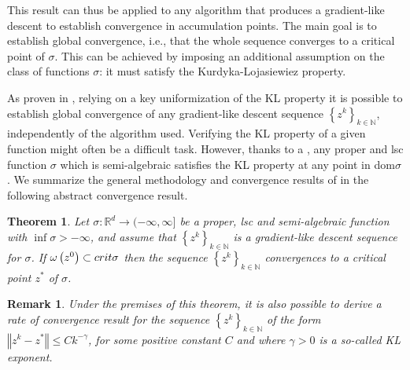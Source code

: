 \documentclass[12pt]{article}
\numberwithin{equation}{section}
\newtheorem{remark}{Remark}
\newtheorem{theorem}{Theorem}
\newcommand{\nn}{\mathbb{N}} %
\newcommand{\rr}{\mathbb{R}} %
\newcommand{\norm}[1]{\left\Vert {#1} \right\Vert} %
\begin{document}
This result can thus be applied to any algorithm that produces a gradient-like descent to establish convergence in accumulation points. The main goal is to establish global convergence, i.e., that the whole sequence converges to a critical point of $\sigma$. This can be achieved by imposing an additional assumption on the class of functions $\sigma$: it must satisfy the Kurdyka-{L}ojasiewiez property.

As proven in \cite{BST2014}, relying on a key uniformization of the KL property it is possible to establish global convergence of any gradient-like descent sequence $\left\lbrace z^k \right\rbrace_{k \in \nn}$, independently of the algorithm used. Verifying the KL property of a given function might often be a difficult task. However, thanks to a , any proper and lsc function $\sigma$ which is semi-algebraic satisfies the KL property at any point in dom$\sigma$. We summarize the general methodology and convergence results of \cite{BST2014} in the following abstract convergence result.

\begin{theorem}
Let $\sigma:\rr^d \rightarrow (-\infty,\infty]$ be a proper, lsc and semi-algebraic function with $\inf \sigma > -\infty$, and assume that $\left\lbrace z^k \right\rbrace_{k \in \nn}$ is a gradient-like descent sequence for $\sigma$. If $\omega\left( z^0 \right) \subset \\ crit\sigma$ then the sequence $\left\lbrace z^k \right\rbrace_{k \in \nn}$ convergences to a critical point $z^{*}$ of $\sigma$.
\end{theorem}

\begin{remark}
Under the premises of this theorem, it is also possible to derive a rate of convergence result for the sequence $\left\lbrace z^k \right\rbrace_{k \in \nn}$ of the form $\norm{z^k - z^{*}} \leq Ck^{-\gamma}$, for some positive constant $C$ and where $\gamma>0$ is a so-called KL exponent.
\end{remark}
\end{document}
